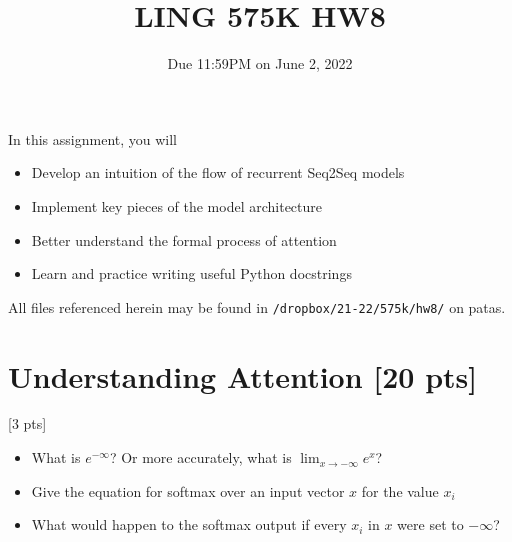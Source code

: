 \documentclass[11pt]{article}
\begin{document}
\title{LING 575K HW8}
\date{\vspace{-0.2in}Due 11:59PM on June 2, 2022}
\maketitle


\noindent In this assignment, you will 
\begin{itemize}
  \item Develop an intuition of the flow of recurrent Seq2Seq models
  \item Implement key pieces of the model architecture
  \item Better understand the formal process of attention
  \item Learn and practice writing useful Python docstrings
\end{itemize}
All files referenced herein may be found in \texttt{/dropbox/21-22/575k/hw8/} on patas.


\section{Understanding Attention [20 pts]}

 \hfill [3 pts]
\begin{itemize}
  \item What is $e^{-\infty}$? Or more accurately, what is $\lim_{x \to -\infty} e^x$?
  \item Give the equation for softmax over an input vector $x$ for the value $x_i$
  \item What would happen to the softmax output if every $x_i$ in $x$ were set to $-\infty$?
\end{itemize}
\end{document}
